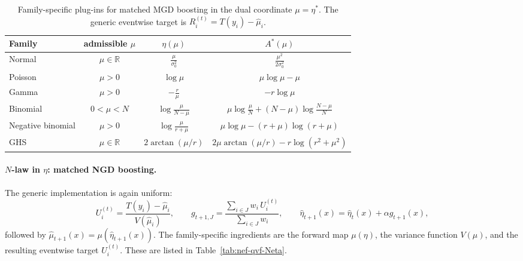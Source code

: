 \documentclass[11pt]{article}
\newcommand{\R}{\mathbb{R}}
\begin{document}
\begin{table}[t]
\centering
\renewcommand{\arraystretch}{1.3}
\setlength{\tabcolsep}{4.5pt}
\begin{tabular}{lccc}
\hline
Family & admissible \(\mu\) & \(\eta(\mu)\) & \(A^\ast(\mu)\) \\
\hline
Normal
&
\(\mu\in\R\)
&
\(\displaystyle \frac{\mu}{\sigma_0^2}\)
&
\(\displaystyle \frac{\mu^2}{2\sigma_0^2}\)
\\[1.2ex]

Poisson
&
\(\mu>0\)
&
\(\displaystyle \log\mu\)
&
\(\displaystyle \mu\log\mu-\mu\)
\\[1.2ex]

Gamma
&
\(\mu>0\)
&
\(\displaystyle -\frac{r}{\mu}\)
&
\(\displaystyle -r\log\mu\)
\\[1.2ex]

Binomial
&
\(0<\mu<N\)
&
\(\displaystyle \log\frac{\mu}{N-\mu}\)
&
\(\displaystyle \mu\log\frac{\mu}{N}+(N-\mu)\log\frac{N-\mu}{N}\)
\\[1.2ex]

Negative binomial
&
\(\mu>0\)
&
\(\displaystyle \log\frac{\mu}{r+\mu}\)
&
\(\displaystyle \mu\log\mu-(r+\mu)\log(r+\mu)\)
\\[1.2ex]

GHS
&
\(\mu\in\R\)
&
\(\displaystyle 2\arctan(\mu/r)\)
&
\(\displaystyle 2\mu\arctan(\mu/r)-r\log(r^2+\mu^2)\)
\\[1.2ex]
\hline
\end{tabular}
\caption{Family-specific plug-ins for matched MGD boosting in the dual coordinate \(\mu=\eta^\ast\). The generic eventwise target is \(R_i^{(t)}=T(y_i)-\hat\mu_i\).}
\label{tab:nef-qvf-Mmu}
\end{table}

\paragraph{\(N\)-law in \(\eta\): matched NGD boosting.}
The generic implementation is again uniform:
\[
U_i^{(t)}=\frac{T(y_i)-\hat\mu_i}{V(\hat\mu_i)},
\qquad
g_{t+1,J}=\frac{\sum_{i\in J}w_i\,U_i^{(t)}}{\sum_{i\in J}w_i},
\qquad
\hat\eta_{t+1}(x)=\hat\eta_t(x)+\alpha g_{t+1}(x),
\]
followed by \(\hat\mu_{t+1}(x)=\mu(\hat\eta_{t+1}(x))\). The family-specific ingredients are the forward map \(\mu(\eta)\), the variance function \(V(\mu)\), and the resulting eventwise target \(U_i^{(t)}\). These are listed in Table~\ref{tab:nef-qvf-Neta}.
\end{document}
